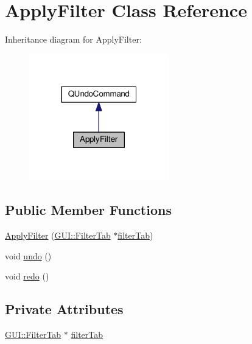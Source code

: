 \hypertarget{classUndoRedo_1_1ApplyFilter}{}\section{Apply\+Filter Class Reference}
\label{classUndoRedo_1_1ApplyFilter}


Inheritance diagram for Apply\+Filter\+:
\nopagebreak
\begin{figure}[H]
\begin{center}
\leavevmode
\includegraphics[width=172pt]{classUndoRedo_1_1ApplyFilter__inherit__graph}
\end{center}
\end{figure}
\subsection*{Public Member Functions}
\begin{DoxyCompactItemize}
\item 
\hyperlink{classUndoRedo_1_1ApplyFilter_a6ca759bf9a36b367359507b28e0b2459}{Apply\+Filter} (\hyperlink{classGUI_1_1FilterTab}{G\+U\+I\+::\+Filter\+Tab} $\ast$\hyperlink{classUndoRedo_1_1ApplyFilter_a47ca82534a740774d79998759818d9f4}{filter\+Tab})
\item 
void \hyperlink{classUndoRedo_1_1ApplyFilter_a0e1e7804a53f6d62efc72c9bdbec8571}{undo} ()
\item 
void \hyperlink{classUndoRedo_1_1ApplyFilter_a93c48d6ed036e1a381be53ac67643284}{redo} ()
\end{DoxyCompactItemize}
\subsection*{Private Attributes}
\begin{DoxyCompactItemize}
\item 
\hyperlink{classGUI_1_1FilterTab}{G\+U\+I\+::\+Filter\+Tab} $\ast$ \hyperlink{classUndoRedo_1_1ApplyFilter_a47ca82534a740774d79998759818d9f4}{filter\+Tab}
\end{DoxyCompactItemize}


